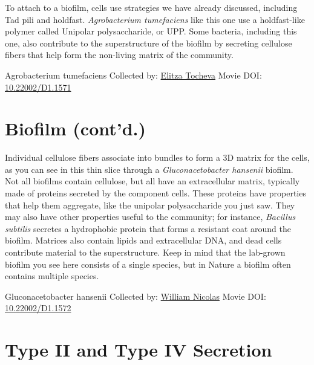 \documentclass[]{tufte-book}
\begin{document}
To attach to a biofilm, cells use strategies we have already discussed, including Tad pili and holdfast. \emph{Agrobacterium tumefaciens} like this one use a holdfast-like polymer called Unipolar polysaccharide, or UPP. Some bacteria, including this one, also contribute to the superstructure of the biofilm by secreting cellulose fibers that help form the non-living matrix of the community.



\hypertarget{htmlwidget-1514a56d4a110af52f8b}{}

\label{fig:9-1}Agrobacterium tumefaciens Collected by: \protect\hyperlink{elitza_tocheva}{Elitza Tocheva} Movie DOI: \href{https://doi.org/10.22002/D1.1571}{10.22002/D1.1571}

\hypertarget{biofilm-contd.}{%
\section{Biofilm (cont'd.)}\label{biofilm-contd.}}

Individual cellulose fibers associate into bundles to form a 3D matrix for the cells, as you can see in this thin slice through a \emph{Gluconacetobacter hansenii} biofilm. Not all biofilms contain cellulose, but all have an extracellular matrix, typically made of proteins secreted by the component cells. These proteins have properties that help them aggregate, like the unipolar polysaccharide you just saw. They may also have other properties useful to the community; for instance, \emph{Bacillus subtilis} secretes a hydrophobic protein that forms a resistant coat around the biofilm. Matrices also contain lipids and extracellular DNA, and dead cells contribute material to the superstructure. Keep in mind that the lab-grown biofilm you see here consists of a single species, but in Nature a biofilm often contains multiple species.



\hypertarget{htmlwidget-465156f017b9996921fb}{}

\label{fig:9-2}Gluconacetobacter hansenii Collected by: \protect\hyperlink{william_nicolas}{William Nicolas} Movie DOI: \href{https://doi.org/10.22002/D1.1572}{10.22002/D1.1572}

\hypertarget{type-ii-and-type-iv-secretion}{%
\section{Type II and Type IV Secretion}\label{type-ii-and-type-iv-secretion}}
\end{document}
